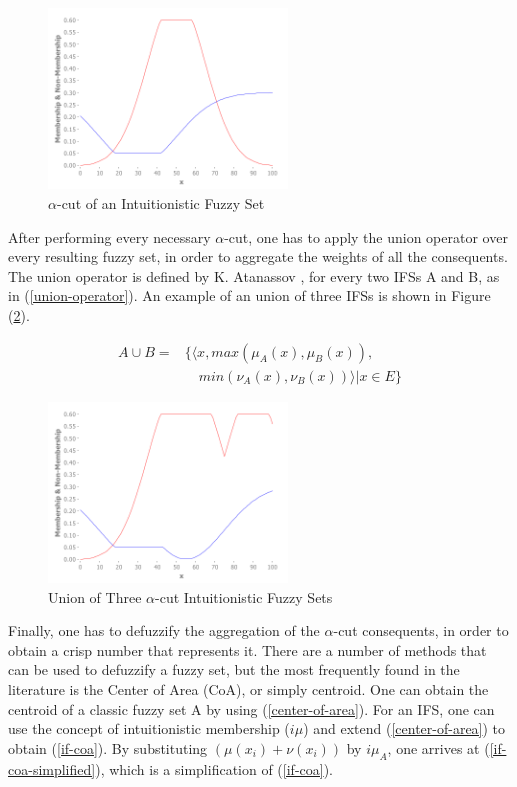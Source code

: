 \documentclass[conference]{IEEEtran}
\begin{document}
\begin{figure}[!t]
  \centering
  \includegraphics[width=2.5in]{alpha-cut}
  \caption{$\alpha$-cut of an Intuitionistic Fuzzy Set}
  \label{alpha-cut-example}
\end{figure}

After performing every necessary $\alpha$-cut, one has to apply the
union operator over every resulting fuzzy set, in order to aggregate
the weights of all the consequents. The union operator is defined by
K. Atanassov \cite{atanassov2013intuitionistic}, for every two IFSs A
and B, as in (\ref{union-operator}). An example of an union of three
IFSs is shown in Figure (\ref{ifs-union}).

\begin{equation}
  \label{union-operator}
  \begin{aligned}
    A \cup B  = &\{ \langle x, max(\mu_{A} (x), \mu_{B} (x)),\\
    &\quad min(\nu_{A} (x), \nu_{B} (x)) \rangle | x \in E \}
\end{aligned}
\end{equation}

\begin{figure}[!t]
  \centering
  \includegraphics[width=2.5in]{ifs-union}
  \caption{Union of Three $\alpha$-cut Intuitionistic Fuzzy Sets}
  \label{ifs-union}
\end{figure}

Finally, one has to defuzzify the aggregation of the $\alpha$-cut 
consequents, in order to obtain a crisp number that represents
it. There are a number of methods that can be used to defuzzify a
fuzzy set, but the most frequently found in the literature is the
Center of Area (CoA), or simply centroid. One can obtain the centroid
of a classic fuzzy set A by using (\ref{center-of-area}). For an
IFS, one can use the concept of intuitionistic membership ($i\mu$) and
extend (\ref{center-of-area}) to obtain (\ref{if-coa}). By
substituting $(\mu(x_{i}) + \nu(x_{i}))$ by $i\mu_{A}$, one arrives at
(\ref{if-coa-simplified}), which is a simplification of (\ref{if-coa}).
\end{document}
